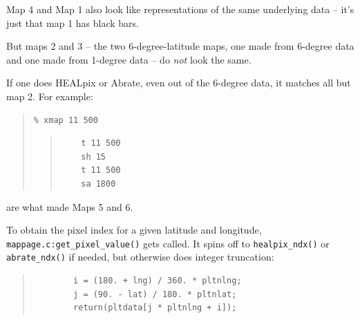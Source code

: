 \documentclass[10pt]{article}
\begin{document}
Map 4 and Map 1 also look like representations of the same underlying data
-- it's just that map 1 has black bars.

But maps 2 and 3 -- the two 6-degree-latitude maps, one made from 6-degree
data and one made from 1-degree data -- do \emph{not} look the same.

If one does HEALpix or Abrate, even out of the 6-degree data, it matches
all but map 2.  For example:

\begin{quotation}
\vspace{-5mm}
\noindent \begin{verbatim}
% xmap 11 500
\end{verbatim}
\begin{quotation}
\noindent \begin{verbatim}
	t 11 500
	sh 15
	t 11 500
	sa 1800
\end{verbatim}
\end{quotation}
\end{quotation}

\noindent are what made Maps 5 and 6.

To obtain the pixel index for a given latitude and longitude,
\texttt{mappage.c:get\_pixel\_value()} gets called.  It spins off to
\texttt{healpix\_ndx()} or \texttt{abrate\_ndx()} if needed, but otherwise
does integer truncation:
\begin{quotation}
\vspace{-5mm}
\noindent \begin{verbatim}
		i = (180. + lng) / 360. * pltnlng;
		j = (90. - lat) / 180. * pltnlat;
		return(pltdata[j * pltnlng + i]);
\end{verbatim}
\end{quotation}
\end{document}
